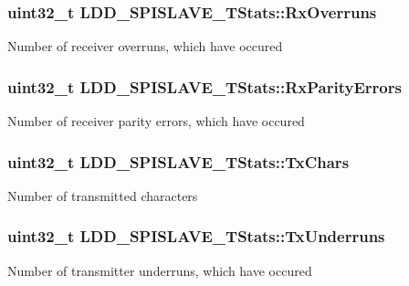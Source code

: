 \subsubsection[{Rx\+Overruns}]{\setlength{\rightskip}{0pt plus 5cm}uint32\+\_\+t L\+D\+D\+\_\+\+S\+P\+I\+S\+L\+A\+V\+E\+\_\+\+T\+Stats\+::\+Rx\+Overruns}\label{struct_l_d_d___s_p_i_s_l_a_v_e___t_stats_a82edd5dc5e18e7cd6a047d0efbda97ae}
Number of receiver overruns, which have occured \hypertarget{struct_l_d_d___s_p_i_s_l_a_v_e___t_stats_abef442625b92cf52c2ff04edf6894dd3}{}
\subsubsection[{Rx\+Parity\+Errors}]{\setlength{\rightskip}{0pt plus 5cm}uint32\+\_\+t L\+D\+D\+\_\+\+S\+P\+I\+S\+L\+A\+V\+E\+\_\+\+T\+Stats\+::\+Rx\+Parity\+Errors}\label{struct_l_d_d___s_p_i_s_l_a_v_e___t_stats_abef442625b92cf52c2ff04edf6894dd3}
Number of receiver parity errors, which have occured \hypertarget{struct_l_d_d___s_p_i_s_l_a_v_e___t_stats_ab674ba50318e198a1ee9dea0692ce239}{}
\subsubsection[{Tx\+Chars}]{\setlength{\rightskip}{0pt plus 5cm}uint32\+\_\+t L\+D\+D\+\_\+\+S\+P\+I\+S\+L\+A\+V\+E\+\_\+\+T\+Stats\+::\+Tx\+Chars}\label{struct_l_d_d___s_p_i_s_l_a_v_e___t_stats_ab674ba50318e198a1ee9dea0692ce239}
Number of transmitted characters \hypertarget{struct_l_d_d___s_p_i_s_l_a_v_e___t_stats_ab2e5342f4a486b20ae9306f451451a77}{}
\subsubsection[{Tx\+Underruns}]{\setlength{\rightskip}{0pt plus 5cm}uint32\+\_\+t L\+D\+D\+\_\+\+S\+P\+I\+S\+L\+A\+V\+E\+\_\+\+T\+Stats\+::\+Tx\+Underruns}\label{struct_l_d_d___s_p_i_s_l_a_v_e___t_stats_ab2e5342f4a486b20ae9306f451451a77}
Number of transmitter underruns, which have occured 

